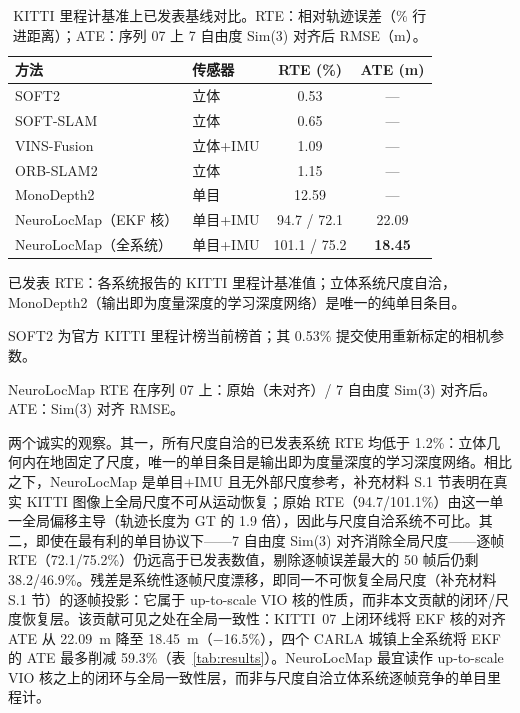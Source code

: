 \begin{table}[!t]
    \centering
    \setlength{\tabcolsep}{4pt}
    \footnotesize
    \caption{KITTI 里程计基准上已发表基线对比。RTE：相对轨迹误差（\% 行进距离）；ATE：序列 07 上 7 自由度 Sim(3) 对齐后 RMSE（m）。}
    \label{tab:external}
    \begin{threeparttable}
        \begin{tabular}{@{}l l c c@{}}
            \toprule
            方法 & 传感器 & RTE (\%) & ATE (m) \\
            \midrule
            SOFT2~\cite{cvisic2023soft2}    & 立体     & 0.53  & --- \\
            SOFT-SLAM~\cite{Cvisic2017}       & 立体     & 0.65  & --- \\
            VINS-Fusion~\cite{VinsFusion2018} & 立体+IMU & 1.09  & --- \\
            ORB-SLAM2~\cite{MurArtal2017}     & 立体     & 1.15  & --- \\
            MonoDepth2~\cite{Godard2021}      & 单目     & 12.59 & --- \\
            \midrule
            NeuroLocMap（EKF 核） & 单目+IMU & 94.7 / 72.1  & 22.09 \\
            NeuroLocMap（全系统） & 单目+IMU & 101.1 / 75.2 & \textbf{18.45} \\
            \bottomrule
        \end{tabular}
        \begin{tablenotes}
            \scriptsize
            \item 已发表 RTE：各系统报告的 KITTI 里程计基准值；立体系统尺度自洽，MonoDepth2（输出即为度量深度的学习深度网络）是唯一的纯单目条目。
            \item SOFT2 为官方 KITTI 里程计榜当前榜首；其 0.53\% 提交使用重新标定的相机参数。
            \item NeuroLocMap RTE 在序列 07 上：原始（未对齐）/ 7 自由度 Sim(3) 对齐后。ATE：Sim(3) 对齐 RMSE。
        \end{tablenotes}
    \end{threeparttable}
\end{table}

两个诚实的观察。其一，所有尺度自洽的已发表系统 RTE 均低于 1.2\%：立体几何内在地固定了尺度，唯一的单目条目是输出即为度量深度的学习深度网络。相比之下，NeuroLocMap 是单目+IMU 且无外部尺度参考，补充材料 S.1 节表明在真实 KITTI 图像上全局尺度不可从运动恢复；原始 RTE（94.7/101.1\%）由这一单一全局偏移主导（轨迹长度为 GT 的 1.9 倍），因此与尺度自洽系统不可比。其二，即使在最有利的单目协议下——7 自由度 Sim(3) 对齐消除全局尺度——逐帧 RTE（72.1/75.2\%）仍远高于已发表数值，剔除逐帧误差最大的 50 帧后仍剩 38.2/46.9\%。残差是系统性逐帧尺度漂移，即同一不可恢复全局尺度（补充材料 S.1 节）的逐帧投影：它属于 up-to-scale VIO 核的性质，而非本文贡献的闭环/尺度恢复层。该贡献可见之处在全局一致性：KITTI~07 上闭环线将 EKF 核的对齐 ATE 从 22.09~m 降至 18.45~m（$-$16.5\%），四个 CARLA 城镇上全系统将 EKF 的 ATE 最多削减 59.3\%（表~\ref{tab:results}）。NeuroLocMap 最宜读作 up-to-scale VIO 核之上的闭环与全局一致性层，而非与尺度自洽立体系统逐帧竞争的单目里程计。

